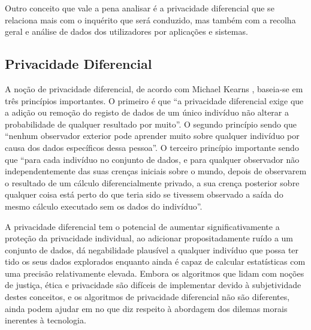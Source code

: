 \documentclass[conference]{IEEEtran}
\begin{document}
Outro conceito que vale a pena analisar é a privacidade diferencial que
se relaciona mais com o inquérito que será conduzido, mas também com a recolha
geral e análise de dados dos utilizadores por aplicações e sistemas.


\subsection{Privacidade Diferencial}

A noção de privacidade diferencial, de acordo com Michael Kearns \cite{kearns2019ethical},
baseia-se em três princípios importantes. O primeiro é que ``a privacidade
diferencial exige que a adição ou remoção do registo de dados de um único
indivíduo não alterar a probabilidade de qualquer resultado por muito''.
O segundo princípio sendo que ``nenhum observador exterior pode aprender
muito sobre qualquer indivíduo por causa dos dados específicos dessa pessoa''.
O terceiro princípio importante sendo que ``para cada indivíduo no conjunto
de dados, e para qualquer observador não independentemente das suas crenças
iniciais sobre o mundo, depois de observarem o resultado de um cálculo diferencialmente
privado, a sua crença posterior sobre qualquer coisa está perto do que teria
sido se tivessem observado a saída do mesmo cálculo executado sem os dados
do indivíduo''.


A privacidade diferencial tem o potencial de aumentar significativamente a
proteção da privacidade individual, ao adicionar propositadamente ruído a
um conjunto de dados, dá negabilidade plausível a qualquer indivíduo que possa
ter tido os seus dados explorados enquanto ainda é capaz de calcular estatísticas
com uma precisão relativamente elevada. Embora os algoritmos que lidam com
noções de justiça, ética e privacidade são difíceis de implementar devido à
subjetividade destes conceitos, e os algoritmos de privacidade diferencial
não são diferentes, ainda podem ajudar em no que diz respeito à abordagem
dos dilemas morais inerentes à tecnologia.
\end{document}
